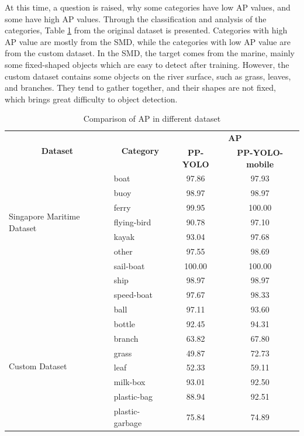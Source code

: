 \documentclass[sensors,article,submit,moreauthors,pdftex]{Definitions/mdpi}
\begin{document}
At this time, a question is raised, why some categories have low AP values, and some have high AP values. Through the classification and analysis of the categories, Table \ref{tbl:Comparison of AP in different dataset} from the original dataset is presented. Categories with high AP value are mostly from the SMD, while the categories with low AP value are from the custom dataset. In the SMD, the target comes from the marine, mainly some fixed-shaped objects which are easy to detect after training. However, the custom dataset contains some objects on the river surface, such as grass, leaves, and branches. They tend to gather together, and their shapes are not fixed, which brings great difficulty to object detection.

\begin{table}[htbp]
\centering
\caption{Comparison of AP in different dataset}
\begin{tabular}{llcc} 
\toprule

\multicolumn{1}{c}{\multirow{2}{*}{\textbf{Dataset}}} &
\multicolumn{1}{c}{\multirow{2}{*}{\textbf{Category}}} &\multicolumn{2}{c}{\textbf{AP}} \\
\cmidrule(l){3-4} 
&& \textbf{PP-YOLO} & \textbf{PP-YOLO-mobile} \\

\midrule
\multirow{7}{*}{Singapore Maritime Dataset} 
& boat& 97.86  & 97.93  \\
& buoy & 98.97 & 98.97 \\
& ferry & 99.95 & 100.00 \\
& flying-bird & 90.78 & 97.10 \\
& kayak & 93.04 & 97.68 \\
& other & 97.55 & 98.69 \\
& sail-boat & 100.00 & 100.00 \\
& ship & 98.97 & 98.97 \\
& speed-boat & 97.67 & 98.33 \\
\cmidrule(r){1-4}

\multirow{8}{*}{Custom Dataset} 
& ball& 97.11  & 93.60 \\
& bottle & 92.45 & 94.31  \\
& branch & 63.82 & 67.80 \\
& grass & 49.87 & 72.73  \\
& leaf & 52.33 & 59.11 \\
& milk-box  & 93.01 & 92.50 \\
& plastic-bag & 88.94 & 92.51 \\
& plastic-garbage & 75.84 & 74.89 \\

\bottomrule
\end{tabular}
\label{tbl:Comparison of AP in different dataset}
\end{table}
\end{document}
